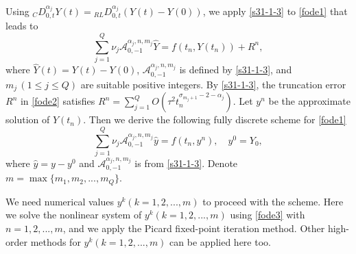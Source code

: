 \documentclass[10pt]{siamltex}
\begin{document}
Using   ${}_{C}D_{0,t}^{\alpha_j}Y(t)= {{}_{RL}D_{0,t}^{\alpha_j}}(Y(t)-Y(0))$,
we   apply \eqref{s31-1-3} to \eqref{fode1}  that leads to
\begin{equation}\label{fode2}
\sum_{j=1}^Q {\nu_j}\mathcal{{A}}_{0,-1}^{\alpha_j,n,m_j}\widehat{Y}
= f(t_n,Y(t_n))+R^n,
\end{equation}
where $\widehat{Y}(t)=Y(t)-Y(0)$, $\mathcal{{A}}_{0,-1}^{\alpha_j,n,m_j}$
is defined by \eqref{s31-1-3},
and $m_j\,(1\leq j\leq Q)$ are suitable positive integers.
%
By \eqref{s31-1-3}, the truncation error $R^n$  in \eqref{fode2}
satisfies $R^n=\sum_{j=1}^QO(\tau^2t_{n}^{\sigma_{m_j+1}-2-\alpha_j})$.
 Let $y^n$ be the approximate solution
of $Y(t_n)$. Then we derive the  following fully discrete scheme for \eqref{fode1}
\begin{equation}\label{fode3}
\sum_{j=1}^Q   {\nu_j}\mathcal{{A}}_{0,-1}^{\alpha_j,n,m_j}\hat{y}
= f(t_n,y^n),{\quad}y^0=Y_0,
\end{equation}
where $\hat{y}=y-y^0$ and $\mathcal{{A}}_{0,-1}^{\alpha_j,n,m_j}$ is from \eqref{s31-1-3}.  Denote  $m=\max\{m_1,m_2,...,m_Q\}$.

\begin{remark}
We need  numerical values $y^k(k=1,2,...,m)$ to
proceed with the scheme.   Here we  solve  the  nonlinear system of $y^k(k=1,2,...,m)$ using \eqref{fode3} with $n=1,2,...,m$,
and we apply the Picard fixed-point iteration method.
Other high-order methods for  $y^k(k=1,2,...,m)$ can be applied here too.
\end{remark}
\end{document}
